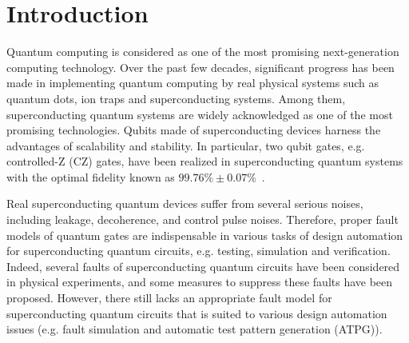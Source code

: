 \documentclass[conference, 9pt]{IEEEtran}
\begin{document}
\section{Introduction}
Quantum computing is considered as one of the most promising next-generation computing technology. Over the past few decades, significant progress has been made in implementing quantum computing by real physical systems such as quantum dots, ion traps and superconducting systems. Among them, superconducting quantum systems are widely acknowledged as one of the most promising technologies. Qubits made of superconducting devices harness the advantages of scalability and stability. 
In particular, two qubit gates, e.g. controlled-Z (CZ) gates, have been realized in superconducting quantum systems with the optimal fidelity known as $99.76\% \pm 0.07\%$~\cite{PhysRevX.11.021058}.

Real superconducting quantum devices suffer from several serious noises, including leakage, decoherence, and control pulse noises. Therefore, proper fault models of quantum gates are indispensable in various tasks of design automation for superconducting quantum circuits, e.g. 
testing, simulation and verification. 
Indeed, several faults of superconducting quantum circuits have been considered in physical experiments, and some measures to suppress these faults have been proposed. However, there still lacks an appropriate fault model for superconducting quantum circuits that is suited to various design automation issues (e.g. fault simulation and automatic test pattern generation (ATPG)).
\end{document}
